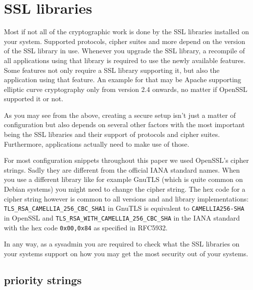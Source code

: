 \section{SSL libraries}
\label{section:ssllibs}


Most if not all of the cryptographic work is done by the SSL libraries installed on
your system. Supported protocols, cipher suites and more depend on the version of
the SSL library in use. Whenever you upgrade the SSL library, a recompile of all
applications using that library is required to use the newly available features.
Some features not only require a SSL library supporting it, but also the application
using that feature. An example for that may be Apache supporting elliptic curve
cryptography only from version 2.4 onwards, no matter if OpenSSL supported it or
not.

As you may see from the above, creating a secure setup isn't just a matter of
configuration but also depends on several other factors with the most important
being the SSL libraries and their support of protocols and cipher suites.
Furthermore, applications actually need to make use of those.

For most configuration snippets throughout this paper we used OpenSSL's cipher
strings. Sadly they are different from the official IANA standard names. When you
use a different library like for example GnuTLS (which is quite common on Debian
systems) you might need to change the cipher string. The hex code for a cipher
string however is common to all versions and and library implementations:
\texttt{TLS\_RSA\_CAMELLIA\_256\_CBC\_SHA1} in GnuTLS is equivalent to
\texttt{CAMELLIA256-SHA} in OpenSSL and \texttt{TLS\_RSA\_WITH\_CAMELLIA\_256\_CBC\_SHA}
in the IANA standard with the hex code \texttt{0x00,0x84} as specified
in RFC5932\cite{rfc5932}.

In any way, as a sysadmin you are required to check what the SSL libraries on
your systems support on how you may get the most security out of your systems.




\subsection{priority strings}

